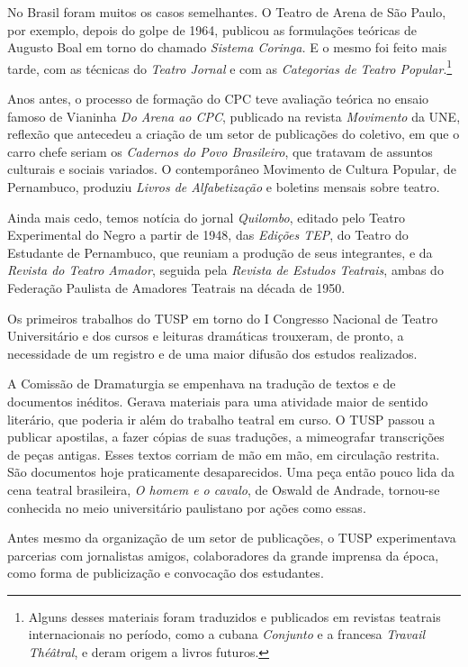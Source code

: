 No Brasil foram muitos os casos semelhantes. O Teatro de Arena de São
Paulo, por exemplo, depois do golpe de 1964, publicou as formulações
teóricas de Augusto Boal em torno do chamado \textit{Sistema Coringa.} E o
mesmo foi feito mais tarde, com as técnicas do \textit{Teatro Jornal} e com
as \textit{Categorias de Teatro Popular}.\footnote{Alguns desses materiais
  foram traduzidos e publicados em revistas teatrais internacionais no
  período, como a cubana \textit{Conjunto} e a francesa \textit{Travail
  Théâtral}, e deram origem a livros futuros.}

Anos antes, o processo de formação do CPC teve avaliação teórica no
ensaio famoso de Vianinha \textit{Do Arena ao CPC}, publicado na revista
\textit{Movimento} da UNE, reflexão que antecedeu a criação de um setor de
publicações do coletivo, em que o carro chefe seriam os \textit{Cadernos do
Povo Brasileiro}, que tratavam de assuntos culturais e sociais variados.
O contemporâneo Movimento de Cultura Popular, de Pernambuco, produziu
\textit{Livros de Alfabetização} e boletins mensais sobre teatro.

Ainda mais cedo, temos notícia do jornal \textit{Quilombo}, editado pelo
Teatro Experimental do Negro a partir de 1948, das \textit{Edições TEP}, do
Teatro do Estudante de Pernambuco, que reuniam a produção de seus
integrantes, e da \textit{Revista do Teatro Amador}, seguida pela
\textit{Revista de Estudos Teatrais}, ambas do Federação Paulista de
Amadores Teatrais na década de 1950.

Os primeiros trabalhos do TUSP em torno do I Congresso Nacional de
Teatro Universitário e dos cursos e leituras dramáticas trouxeram, de
pronto, a necessidade de um registro e de uma maior difusão dos estudos
realizados.

A Comissão de Dramaturgia se empenhava na tradução de textos e de
documentos inéditos. Gerava materiais para uma atividade maior de
sentido literário, que poderia ir além do trabalho teatral em curso. O
TUSP passou a publicar apostilas, a fazer cópias de suas traduções, a
mimeografar transcrições de peças antigas. Esses textos corriam de mão
em mão, em circulação restrita. São documentos hoje praticamente
desaparecidos. Uma peça então pouco lida da cena teatral brasileira,
\textit{O homem e o cavalo}, de Oswald de Andrade, tornou-se conhecida no
meio universitário paulistano por ações como essas.

Antes mesmo da organização de um setor de publicações, o TUSP
experimentava parcerias com jornalistas amigos, colaboradores da grande
imprensa da época, como forma de publicização e convocação dos
estudantes.

